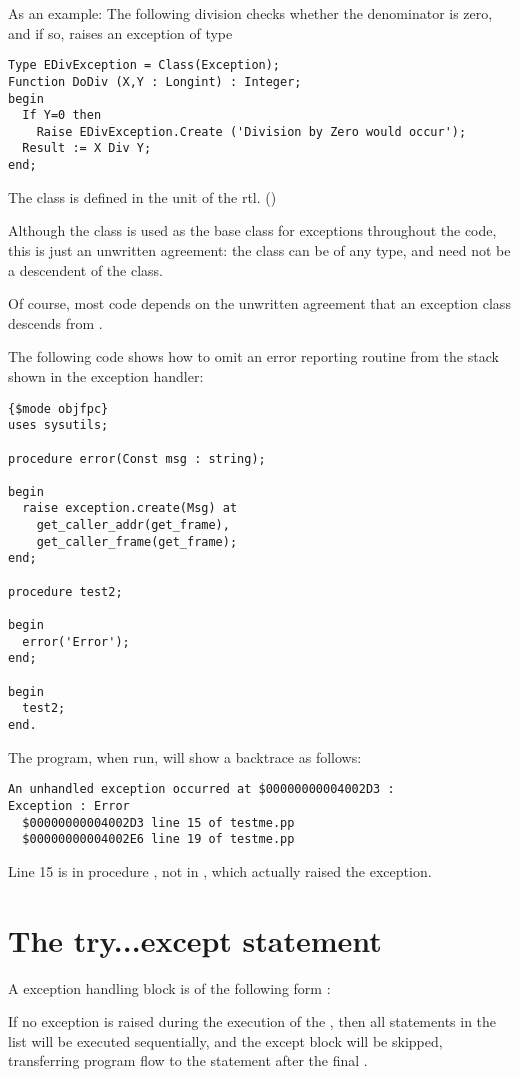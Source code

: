 As an example: The following division checks whether the denominator is
zero, and if so, raises an exception of type 
\begin{verbatim}
Type EDivException = Class(Exception);
Function DoDiv (X,Y : Longint) : Integer;
begin
  If Y=0 then
    Raise EDivException.Create ('Division by Zero would occur');
  Result := X Div Y;
end;
\end{verbatim}
The class  is defined in the  unit of the rtl.
()

\begin{remark}
Although the  class is used as the base class for exceptions
throughout the code, this is just an unwritten agreement: the class can
be of any type, and need not be a descendent of the  class.

Of course, most code depends on the unwritten agreement that an exception
class descends from .
\end{remark}

The following code shows how to omit an error reporting routine from the
stack shown in the exception handler:
\begin{verbatim}
{$mode objfpc}
uses sysutils;

procedure error(Const msg : string);

begin
  raise exception.create(Msg) at 
    get_caller_addr(get_frame),
    get_caller_frame(get_frame);
end;

procedure test2;

begin
  error('Error');
end;

begin
  test2;
end.
\end{verbatim}
The program, when run, will show a backtrace as follows:
\begin{verbatim}
An unhandled exception occurred at $00000000004002D3 :
Exception : Error
  $00000000004002D3 line 15 of testme.pp
  $00000000004002E6 line 19 of testme.pp
\end{verbatim}
Line 15 is in procedure , not in , which actually raised the exception.

\section{The try...except statement}
   
A  exception handling block is of the following form :

If no exception is raised during the execution of the ,
then all statements in the list will be executed sequentially, and the
except block will be skipped, transferring program flow to the statement
after the final .

